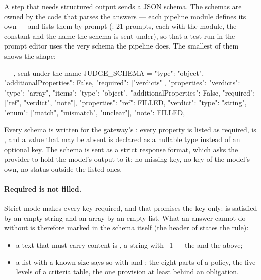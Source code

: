 A step that needs structured output sends a JSON schema. The schemas are owned by the code
that parses the answers --- each pipeline module defines its own --- and
 lists them by prompt (: 21 prompts, each with the
module, the constant and the name the schema is sent under), so that a test run in the prompt
editor uses the very schema the pipeline does. The smallest of them shows the shape:

\begin{codefile}{ --- , sent under the name }
JUDGE_SCHEMA = {
    "type": "object", "additionalProperties": False, "required": ["verdicts"],
    "properties": {"verdicts": {"type": "array", "items": {
        "type": "object", "additionalProperties": False, "required": ["ref", "verdict", "note"],
        "properties": {"ref": FILLED,
                       "verdict": {"type": "string", "enum": ["match", "mismatch", "unclear"]},
                       "note": FILLED}}}},
}
\end{codefile}

Every schema is written for the gateway's : every property is listed as
required,  is , and a value that may be absent is
declared as a nullable type instead of an optional key. The schema is sent as a strict response
format, which asks the provider to hold the model's output to it: no missing key, no key of
the model's own, no status outside the listed ones.

\paragraph{Required is not filled.}\label{par:models:filled} Strict mode makes every key
required, and that promises the key only:  is satisfied by an empty
string and an array by an empty list. What an answer cannot do without is therefore marked in
the schema itself (the header of  states the rule):

\begin{itemize}
  \item a text that must carry content is , a string with ~1 ---
    the  and the  above;
  \item a list with a known size says so with  and : the eight
    parts of a policy, the five levels of a criteria table, the one provision at least behind
    an obligation.
\end{itemize}

